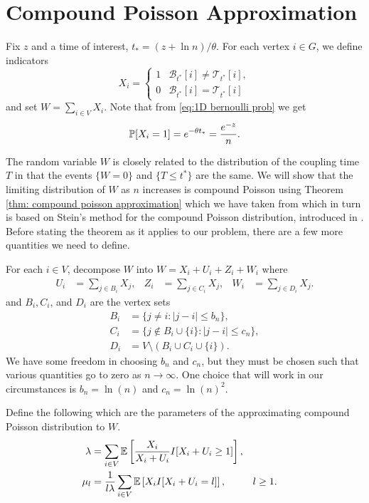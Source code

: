 	\section{Compound Poisson Approximation}
	Fix $z$ and a time of interest, $t_* = (z + \ln n)/\theta$. For each vertex $i \in G$, we define indicators
	\begin{equation}
		X_i = 
		\begin{cases}
			1 & \mathscr{B}_{t^*}[i] \neq \mathscr{T}_{t^*}[i],\\
			0 & \mathscr{B}_{t^*}[i] = \mathscr{T}_{t^*}[i]
		\end{cases}
	\end{equation}
	and set $W = \sum_{i \in V} X_i$. Note that from \eqref{eq:1D bernoulli prob} we get
	\begin{equation}
		\label{eq:1D prob X_i}
		\mathbb{P}[X_i = 1] = e^{-\theta t_*} = \frac{e^{-z}}{n}.
	\end{equation}

	The random variable $W$ is closely related to the distribution of the coupling time $T$ in that the events $\{W = 0\}$ and $\{T \leq t^*\}$ are the same. We will show that the limiting distribution of $W$ as $n$ increases is compound Poisson using Theorem \ref{thm: compound poisson approximation} which we have taken from \cite{Barbour2001-nh} which in turn is based on Stein's method for the compound Poisson distribution, introduced in \cite{Barbour1992-mc}. Before stating the theorem as it applies to our problem, there are a few more quantities we need to define.

	For each $i \in V$, decompose $W$ into $W = X_i + U_i + Z_i + W_i$ where
	\begin{align}
		U_i &= \sum_{j \in B_i} X_j, &
		Z_i &= \sum_{j \in C_i} X_j, &
		W_i &= \sum_{j \in D_i} X_j.
	\end{align}
	and $B_i, C_i$, and $D_i$ are the vertex sets
	\begin{align}
		B_i &= \{j\neq i : |j - i| \leq b_n \},\\
		C_i &= \{j\notin B_i\cup \{i\}: |j - i| \leq c_n \},\\
		D_i &= V \setminus (B_i \cup C_i \cup \{i\}).
	\end{align}
	We have some freedom in choosing $b_n$ and $c_n$, but they must be chosen such that various quantities go to zero as $n \rightarrow \infty$. One choice that will work in our circumstances is $b_n = \ln(n)$ and $c_n = \ln(n)^2$.

	Define the following which are the parameters of the approximating compound Poisson distribution to $W$.
	\begin{align}
		\lambda &= \sum_{i \in V} \mathbb{E}\left[\frac{X_i}{X_i + U_i} I[ X_i + U_i \geq 1] \right],\\
		\mu_l &= \frac{1}{l \lambda} \sum_{i \in V} \mathbb{E}\left[ X_i I[X_i + U_i = l] \right], && l\geq 1.
	\end{align}

